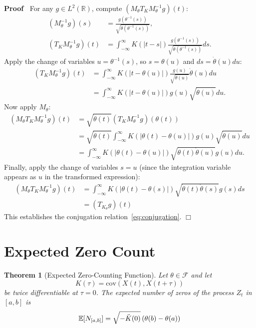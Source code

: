 \documentclass{article}
\newenvironment{proof}{\noindent\textbf{Proof\ }}{\hspace*{\fill}$\Box$\medskip}
\newtheorem{theorem}{Theorem}
\begin{document}
\begin{proof}
For any $g \in L^2 (\mathbb{R})$, compute $(M_{\theta} T_K M_{\theta}^{- 1}
g) (t)$:
\begin{align}
(M_{\theta}^{- 1} g) (s) & = \frac{g (\theta^{- 1} (s))}{\sqrt{\dot{\theta}
(\theta^{- 1} (s))}}, \\
(T_K M_{\theta}^{- 1} g) (t) & = \int_{- \infty}^{\infty} K (|t - s|)
\frac{g (\theta^{- 1} (s))}{\sqrt{\dot{\theta} (\theta^{- 1} (s))}} ds.
\end{align}
Apply the change of variables $u = \theta^{- 1} (s)$, so $s = \theta (u)$
and $ds = \dot{\theta} (u) du$:
\begin{align}
(T_K M_{\theta}^{- 1} g) (t) & = \int_{- \infty}^{\infty} K (|t - \theta
(u) |) \frac{g (u)}{\sqrt{\dot{\theta} (u)}} \dot{\theta} (u) du \\
& = \int_{- \infty}^{\infty} K (|t - \theta (u) |) g (u)
\sqrt{\dot{\theta} (u)} du.
\end{align}
Now apply $M_{\theta}$:
\begin{align}
(M_{\theta} T_K M_{\theta}^{- 1} g) (t) & = \sqrt{\dot{\theta} (t)} (T_K
M_{\theta}^{- 1} g) (\theta (t)) \\
& = \sqrt{\dot{\theta} (t)} \int_{- \infty}^{\infty} K (| \theta (t) -
\theta (u) |) g (u) \sqrt{\dot{\theta} (u)} du \\
& = \int_{- \infty}^{\infty} K (| \theta (t) - \theta (u) |) 
\sqrt{\dot{\theta} (t) \dot{\theta} (u)} g (u) du.
\end{align}
Finally, apply the change of variables $s = u$ (since the integration variable appears as $u$ in the transformed expression):
\begin{align}
(M_{\theta} T_K M_{\theta}^{- 1} g) (t) & = \int_{- \infty}^{\infty} K (| \theta (t) - \theta (s) |) \sqrt{\dot{\theta} (t) \dot{\theta} (s)} g (s) ds \\
& = (T_{K_{\theta}} g) (t)
\end{align}
This establishes the conjugation relation~\eqref{eq:conjugation}.
\end{proof}

\section{Expected Zero Count}\label{sec:zero_count}

\begin{theorem}
[Expected Zero-Counting Function]\label{thm:zero_count} Let $\theta \in
\mathcal{F}$ and let
\begin{equation}
K (\tau) = \mathrm{cov} (X (t), X (t+\tau))
\end{equation}
be twice differentiable at $\tau = 0$. The expected number of zeros of the
process $Z_t$ in $[a, b]$ is
\begin{equation}
\label{eq:zero_count} \mathbb{E} [N_{[a, b]}] = \sqrt{- \ddot{K} (0)}
\hspace{0.17em} (\theta (b) - \theta (a))
\end{equation}
\end{theorem}
\end{document}

